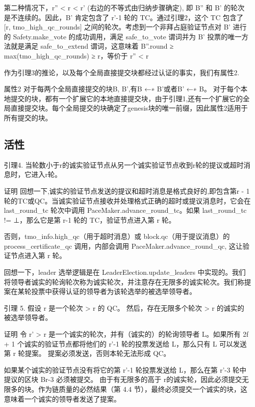第二种情况下，r'' < r < r' (右边的不等式由归纳步骤确定), 即 B'' 和 B' 的轮次是不连续的。因此，B' 肯定包含了 r'-1 轮的 TC。通过引理2，这个 TC 包含了 [r, tmo\_high\_qc\_rounds] 之间的轮次。考虑到一个非拜占庭验证节点对 B' 进行的 Safety.make\_vote 的成功调用，满足 safe\_to\_vote 谓词并为 B' 投票的唯一方法就是满足 safe\_to\_extend 谓词，这意味着 B''.round ≥ max(tmo\_high\_qc\_rounds) ≥ r，等价于 r'' < r

作为引理3的推论，以及每个全局直接提交块都经过认证的事实，我们有属性2. 

属性2 对于每两个全局直接提交的块B, B',有B ←∗ B'或者B' ←∗ B。
对于每个本地提交的块，都有一个扩展它的本地直接提交块，由于引理1,还有一个扩展它的全局直接提交块。每个全局提交的块确定了genesis块的唯一前缀，因此属性2适用于所有提交的块。

\subsection{活性}

引理4. 当轮数小于r的诚实验证节点从另一个诚实验证节点收到r轮的提议或超时消息时，它进入r轮。

证明 回想一下,诚实的验证节点发送的提议和超时消息是格式良好的,即包含第r - 1轮的TC或QC。当诚实验证节点接收并处理格式正确的超时或提议消息时，它会在 last\_round\_tc 轮次中调用 PaceMaker.advance\_round\_tc。如果 last\_round\_tc != ⊥，那么它是第 r-1 轮的 TC，验证节点进入第 r 轮。

否则，tmo\_info.high\_qc（用于超时消息）或 block.qc（用于提议消息）的 process\_certificate\_qc 调用，内部会调用 PaceMaker.advance\_round\_qc, 这让验证节点进入第 r 轮。

回想一下，leader 选举逻辑是在 LeaderElection.update\_leaders 中实现的。我们将领导者诚实的轮询轮次称为诚实轮次，并注意存在无限多的诚实轮次。我们称提案在某轮投票中获得认证的领导者为该轮选举的被选举领导者。

引理 5. 假设 r 是一个轮次 > r 的 QC。 然后，存在无限多个轮次 > r 的诚实的被选举领导者。

证明  令 r' > r 是一个诚实的轮次，并有（诚实的）的轮询领导者 L。如果所有 2f + 1 个诚实的验证节点都将他们的 r'-1 轮的投票发送给 L，那么只有 L 可以发送第 r 轮提案。 提案必须发送，否则本轮无法形成 QC。

如果某个诚实的验证节点没有将它的第 r'-1 轮投票发送给 L，那么在第 r'-3 轮中提议的区块 Br-3 必须被提交。 由于有无限多的高于 r的诚实轮，因此必须提交无限多的块。作为链质量的必然结果（第 4.4 节），最终必须提交一个诚实的块，这意味着一个诚实的领导者发送了提案。

